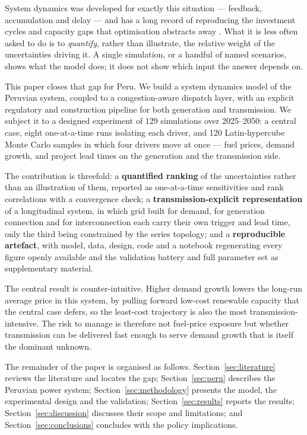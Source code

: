 System dynamics was developed for exactly this situation --- feedback, accumulation
and delay \citep{forrester1997,sterman2000} --- and has a long record of reproducing
the investment cycles and capacity gaps that optimisation abstracts away
\citep{ford2001,arango2007,assili2008,zapata2018}. What it is less often asked to do
is to \emph{quantify}, rather than illustrate, the relative weight of the
uncertainties driving it. A single simulation, or a handful of named scenarios, shows
what the model does; it does not show which input the answer depends on.

This paper closes that gap for Peru. We build a system dynamics model of the Peruvian
system, coupled to a congestion-aware dispatch layer, with an explicit regulatory and
construction pipeline for both generation and transmission. We subject it to a
designed experiment of 129 simulations over 2025--2050: a central case, eight
one-at-a-time runs isolating each driver, and 120 Latin-hypercube Monte Carlo samples
in which four drivers move at once --- fuel prices, demand growth, and project lead
times on the generation and the transmission side.

The contribution is threefold: a \textbf{quantified ranking} of the uncertainties
rather than an illustration of them, reported as one-at-a-time sensitivities and rank
correlations with a convergence check; a \textbf{transmission-explicit representation}
of a longitudinal system, in which grid built for demand, for generation connection and
for interconnection each carry their own trigger and lead time, only the third being
constrained by the series topology; and a \textbf{reproducible artefact}, with model,
data, design, code and a notebook regenerating every figure openly available and the
validation battery and full parameter set as supplementary material.

The central result is counter-intuitive. Higher demand growth lowers the long-run
average price in this system, by pulling forward low-cost renewable capacity that the
central case defers, so the least-cost trajectory is also the most
transmission-intensive. The risk to manage is therefore not fuel-price exposure but
whether transmission can be delivered fast enough to serve demand growth that is itself
the dominant unknown.

The remainder of the paper is organised as follows. Section~\ref{sec:literature}
reviews the literature and locates the gap; Section~\ref{sec:peru} describes the
Peruvian power system; Section~\ref{sec:methodology} presents the model, the
experimental design and the validation; Section~\ref{sec:results} reports the
results; Section~\ref{sec:discussion} discusses their scope and limitations; and
Section~\ref{sec:conclusions} concludes with the policy implications.
